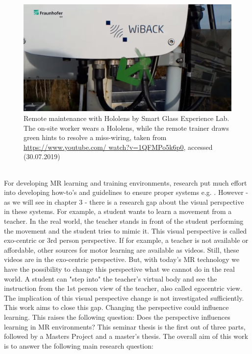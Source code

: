 \begin{figure}
	\centering
	\includegraphics[width=1.0\textwidth]{img/fraunhofer.PNG}
	\caption{Remote maintenance with Hololens by Smart Glass Experience Lab. The on-site worker wears a Hololens, while the remote trainer draws green hints to resolve a miss-wiring, taken from \hyperlink{https://www.youtube.com/watch?v=1QFMPo5k6p0}{https://www.youtube.com/ watch?v=1QFMPo5k6p0}, accessed (30.07.2019)}
	\label{fig:fraunhofer}
\end{figure}\\
For developing MR learning and training environments, research put much effort into developing how-to's and guidelines to ensure proper systems e.g. \cite{LaViola2017}. However - as we will see in chapter 3 - there is a research gap about the visual perspective in these systems. For example, a student wants to learn a movement from a teacher. In the real world, the teacher stands in front of the student performing the movement and the student tries to mimic it. This visual perspective is called exo-centric or 3rd person perspective. If for example, a teacher is not available or affordable, other sources for motor learning are available as videos. Still, these videos are in the exo-centric perspective. But, with today's MR technology we have the possibility to change this perspective what we cannot do in the real world. A student can "step into" the teacher's virtual body and see the instruction from the 1st person view of the teacher, also called egocentric view. The implication of this visual perspective change is not investigated sufficiently. This work aims to close this gap. Changing the perspective could influence learning. This raises the following question: Does the perspective influences learning in MR environments? 
This seminar thesis is the first out of three parts, followed by a Masters Project and a master's thesis. The overall aim of this work is to answer the following main research question:
